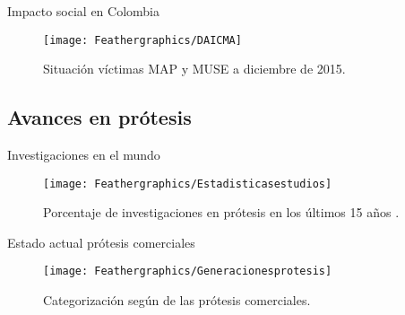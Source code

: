 \documentclass[10pt]{beamer}
\begin{document}
\begin{frame}{Impacto social en Colombia}

\begin{figure}
\begin{centering}
\texttt{[image: Feathergraphics/DAICMA]}
\par\end{centering}
\caption{{\scriptsize{}Situación víctimas MAP y MUSE a diciembre de 2015.\cite{PAICMA}}}
\end{figure}

\end{frame}


\subsection{Avances en prótesis}
\begin{frame}{Investigaciones en el mundo}

\begin{figure}
\begin{centering}
\texttt{[image: Feathergraphics/Estadisticasestudios]}
\par\end{centering}
\caption{Porcentaje de investigaciones en prótesis en los últimos 15 años \cite{Eshraghi2013}.}
\end{figure}
\end{frame}

\begin{frame}{Estado actual prótesis comerciales}

\begin{figure}
\begin{centering}
\texttt{[image: Feathergraphics/Generacionesprotesis]}
\par\end{centering}
\caption{{\footnotesize{}Categorización según \cite{Cherelle2014a} de las
prótesis comerciales.} }

\end{figure}

\end{frame}
\end{document}
